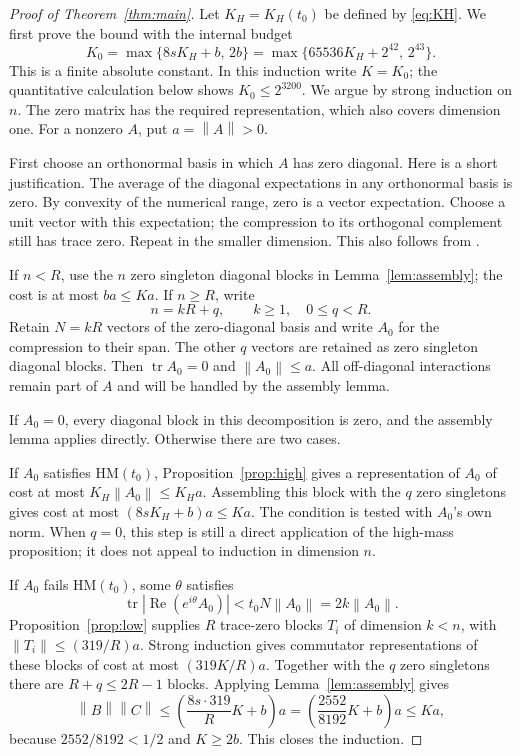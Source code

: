 \documentclass[11pt]{article}
\theoremstyle{remark}
\newcommand{\tr}{\operatorname{tr}}
\newcommand{\Rea}{\operatorname{Re}}
\newcommand{\norm}[1]{\left\lVert#1\right\rVert}
\newcommand{\HM}{\mathrm{HM}}
\numberwithin{equation}{section}
\begin{document}
\begin{proof}[Proof of Theorem~\ref{thm:main}]
Let $K_H=K_H(t_0)$ be defined by \eqref{eq:KH}. We first prove the bound
with the internal budget
\begin{equation}\label{eq:K}
 K_0=\max\{8sK_H+b,\,2b\}
  =\max\{65536K_H+2^{42},\,2^{43}\}.
\end{equation}
This is a finite absolute constant. In this induction write $K=K_0$; the
quantitative calculation below shows $K_0\le2^{3200}$.
We argue by strong induction on $n$.
The zero matrix has the required representation, which also covers dimension
one. For a nonzero $A$, put $a=\norm A>0$.

First choose an orthonormal basis in which $A$ has zero diagonal. Here is a
short justification. The average of the diagonal expectations in any
orthonormal basis is zero. By convexity of the numerical range, zero is a
vector expectation. Choose a unit vector with this expectation; the
compression to its orthogonal complement still has trace zero. Repeat in the
smaller dimension. This also follows from \cite[Corollary 14]{DF}.

If $n<R$, use the $n$ zero singleton diagonal blocks in
Lemma~\ref{lem:assembly}; the cost is at most $ba\le Ka$.
If $n\ge R$, write
\[
 n=kR+q,\qquad k\ge1,\quad0\le q<R.
\]
Retain $N=kR$ vectors of the zero-diagonal basis and write $A_0$ for the
compression to their span. The other $q$ vectors are retained as zero
singleton diagonal blocks. Then $\tr A_0=0$ and $\norm{A_0}\le a$. All
off-diagonal interactions remain part of $A$ and will be handled by the
assembly lemma.

If $A_0=0$, every diagonal block in this decomposition is zero, and the
assembly lemma applies directly. Otherwise there are two cases.

If $A_0$ satisfies $\HM(t_0)$, Proposition~\ref{prop:high} gives a
representation of $A_0$ of cost at most $K_H\norm{A_0}\le K_Ha$. Assembling
this block with the $q$ zero singletons gives cost at most
$(8sK_H+b)a\le Ka$. The condition is tested with $A_0$'s own norm. When
$q=0$, this step is still a direct application of the high-mass proposition;
it does not appeal to induction in dimension $n$.

If $A_0$ fails $\HM(t_0)$, some $\theta$ satisfies
\[
 \tr|\Rea(e^{i\theta}A_0)|
 <t_0N\norm{A_0}=2k\norm{A_0}.
\]
Proposition~\ref{prop:low} supplies $R$ trace-zero blocks $T_i$ of dimension
$k<n$, with $\norm{T_i}\le(319/R)a$. Strong induction gives commutator
representations of these blocks of cost at most $(319K/R)a$. Together with
the $q$ zero singletons there are $R+q\le2R-1$ blocks. Applying
Lemma~\ref{lem:assembly} gives
\[
 \norm B\norm C
 \le\left(\frac{8s\cdot319}{R}K+b\right)a
 =\left(\frac{2552}{8192}K+b\right)a
 \le Ka,
\]
because $2552/8192<1/2$ and $K\ge2b$. This closes the induction.
\end{proof}
\end{document}
